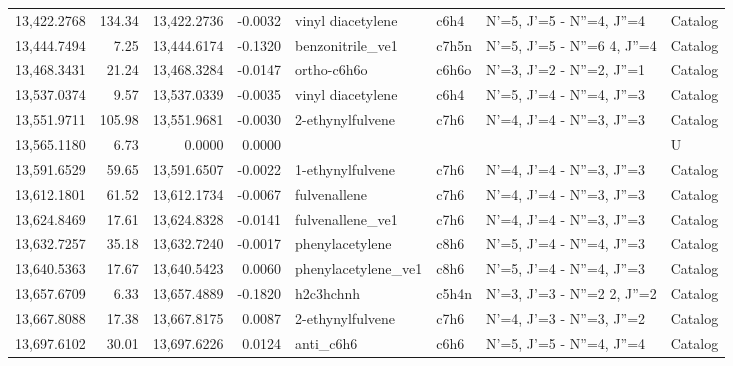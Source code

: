 \begin{longtable}{rrrrllll}
13,422.2768 &    134.34 &       13,422.2736 &   -0.0032 &           vinyl diacetylene &    c6h4 &            N'=5, J'=5 - N''=4, J''=4 &    Catalog \\
13,444.7494 &      7.25 &       13,444.6174 &   -0.1320 &            benzonitrile_ve1 &   c7h5n &      N'=5, J'=5 - N''=6     4, J''=4 &    Catalog \\
13,468.3431 &     21.24 &       13,468.3284 &   -0.0147 &                 ortho-c6h6o &   c6h6o &            N'=3, J'=2 - N''=2, J''=1 &    Catalog \\
13,537.0374 &      9.57 &       13,537.0339 &   -0.0035 &           vinyl diacetylene &    c6h4 &            N'=5, J'=4 - N''=4, J''=3 &    Catalog \\
13,551.9711 &    105.98 &       13,551.9681 &   -0.0030 &            2-ethynylfulvene &    c7h6 &            N'=4, J'=4 - N''=3, J''=3 &    Catalog \\
13,565.1180 &      6.73 &            0.0000 &    0.0000 &                             &         &                                      &          U \\
13,591.6529 &     59.65 &       13,591.6507 &   -0.0022 &            1-ethynylfulvene &    c7h6 &            N'=4, J'=4 - N''=3, J''=3 &    Catalog \\
13,612.1801 &     61.52 &       13,612.1734 &   -0.0067 &                fulvenallene &    c7h6 &            N'=4, J'=4 - N''=3, J''=3 &    Catalog \\
13,624.8469 &     17.61 &       13,624.8328 &   -0.0141 &            fulvenallene_ve1 &    c7h6 &            N'=4, J'=4 - N''=3, J''=3 &    Catalog \\
13,632.7257 &     35.18 &       13,632.7240 &   -0.0017 &             phenylacetylene &    c8h6 &            N'=5, J'=4 - N''=4, J''=3 &    Catalog \\
13,640.5363 &     17.67 &       13,640.5423 &    0.0060 &         phenylacetylene_ve1 &    c8h6 &            N'=5, J'=4 - N''=4, J''=3 &    Catalog \\
13,657.6709 &      6.33 &       13,657.4889 &   -0.1820 &                   h2c3hchnh &   c5h4n &      N'=3, J'=3 - N''=2     2, J''=2 &    Catalog \\
13,667.8088 &     17.38 &       13,667.8175 &    0.0087 &            2-ethynylfulvene &    c7h6 &            N'=4, J'=3 - N''=3, J''=2 &    Catalog \\
13,697.6102 &     30.01 &       13,697.6226 &    0.0124 &                   anti_c6h6 &    c6h6 &            N'=5, J'=5 - N''=4, J''=4 &    Catalog \\

\end{longtable}
